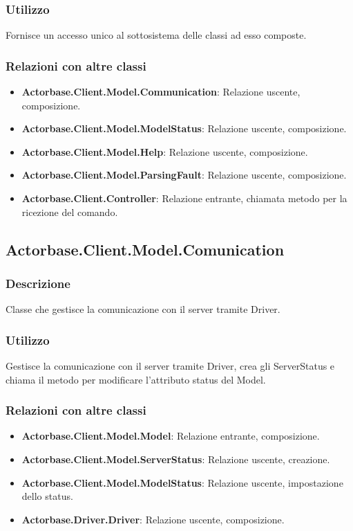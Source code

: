 \documentclass[a4paper]{article}
\begin{document}
			\subsubsection{Utilizzo}
				Fornisce un accesso unico al sottosistema delle classi ad esso composte.
			\subsubsection{Relazioni con altre classi}
				\begin{itemize}
					\item \textbf{Actorbase.Client.Model.Communication}: Relazione uscente, composizione.
					\item \textbf{Actorbase.Client.Model.ModelStatus}: Relazione uscente, composizione.
					\item \textbf{Actorbase.Client.Model.Help}: Relazione uscente, composizione.
					\item \textbf{Actorbase.Client.Model.ParsingFault}:	Relazione uscente, composizione.
					\item \textbf{Actorbase.Client.Controller}:	Relazione entrante, chiamata metodo per la ricezione del comando.	
				\end{itemize}
			
		\subsection{Actorbase.Client.Model.Comunication}
			\subsubsection{Descrizione}
				Classe che gestisce la comunicazione con il server tramite Driver.
			\subsubsection{Utilizzo}
				Gestisce la comunicazione con il server tramite Driver, crea gli ServerStatus e chiama il metodo per modificare l'attributo status del Model.
			\subsubsection{Relazioni con altre classi}
				\begin{itemize}
					\item \textbf{Actorbase.Client.Model.Model}: Relazione entrante, composizione.
					\item \textbf{Actorbase.Client.Model.ServerStatus}: Relazione uscente, creazione.
					\item \textbf{Actorbase.Client.Model.ModelStatus}: Relazione uscente, impostazione dello status.
					\item \textbf{Actorbase.Driver.Driver}: Relazione uscente, composizione.
				\end{itemize}
		
\end{document}
